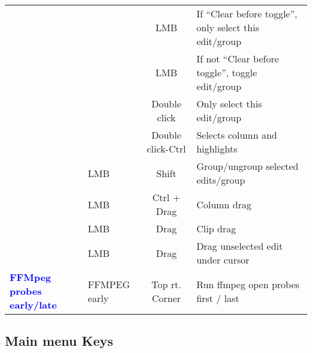 \begin{center}
\begin{longtable}{ >{\bfseries}p{2cm} l c p{6cm}}
        &  & LMB & If “Clear before toggle”, only select this edit/group \\        
        &  & LMB & If not “Clear before toggle”, toggle edit/group \\        
        &  & Double click & Only select this edit/group \\        
        &  & Double click-Ctrl & Selects column and highlights \\        
        & LMB & Shift & Group/ungroup selected edits/group \\        
        & LMB & Ctrl + Drag & Column drag \\        
        & LMB & Drag & Clip drag \\        
        & LMB & Drag & Drag unselected edit under cursor \\
        \midrule
        \textcolor{blue}{FFMpeg probes early/late} & FFMPEG early & Top rt. Corner & Run ffmpeg open probes first / last \\
        
        
        \bottomrule  
    \end{longtable}
\end{center}

\subsection{Main menu Keys}%
\label{sub:main_menu_keys}

